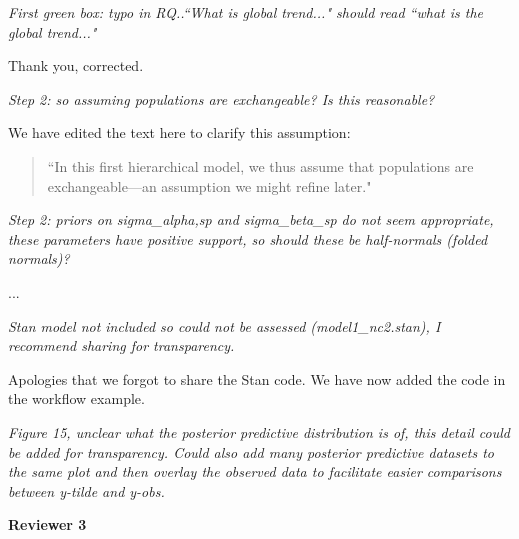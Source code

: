 \documentclass[11pt,letter]{article}
\begin{document}
\begin{mybox}
\emph{First green box: typo in RQ..``What is global trend..." should read
``what is the global trend..."}
\end{mybox}

Thank you, corrected.

\begin{mybox}
\emph{Step 2: so assuming populations are exchangeable? Is this reasonable?}
\end{mybox}

We have edited the text here to clarify this assumption:
\begin{quote}
``In this first hierarchical model, we thus assume that populations are exchangeable---an assumption we might refine later."
\end{quote}


\begin{mybox}
\emph{Step 2: priors on sigma\_alpha,sp and sigma\_beta\_sp do not seem
appropriate, these parameters have positive support, so should these be
half-normals (folded normals)?}
\end{mybox}

... %

\begin{mybox}
\emph{Stan model not included so could not be assessed (model1\_nc2.stan), I
recommend sharing for transparency.}
\end{mybox}

Apologies that we forgot to share the Stan code. We have now added the code in the workflow example.

\begin{mybox}
\emph{Figure 15, unclear what the posterior predictive distribution is of,
this detail could be added for transparency. Could also add many
posterior predictive datasets to the same plot and then overlay the
observed data to facilitate easier comparisons between y-tilde and y-obs.}
\end{mybox}


{\bf Reviewer 3} %
\end{document}
